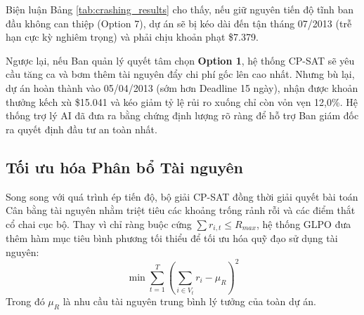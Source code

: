 \begin{table}[H]
\centering
\caption{Tập phương án tối ưu Pareto (Ép tiến độ) cho dự án C2012-04}
\label{tab:crashing_results}
\end{table}

Biện luận Bảng \ref{tab:crashing_results} cho thấy, nếu giữ nguyên tiến độ tĩnh ban đầu không can thiệp (Option 7), dự án sẽ bị kéo dài đến tận tháng 07/2013 (trễ hạn cực kỳ nghiêm trọng) và phải chịu khoản phạt \$7.379. 

Ngược lại, nếu Ban quản lý quyết tâm chọn \textbf{Option 1}, hệ thống CP-SAT sẽ yêu cầu tăng ca và bơm thêm tài nguyên đẩy chi phí gốc lên cao nhất. Nhưng bù lại, dự án hoàn thành vào 05/04/2013 (sớm hơn Deadline 15 ngày), nhận được khoản thưởng kếch xù \$15.041 và kéo giảm tỷ lệ rủi ro xuống chỉ còn vỏn vẹn 12,0\%. Hệ thống trợ lý AI đã đưa ra bằng chứng định lượng rõ ràng để hỗ trợ Ban giám đốc ra quyết định đầu tư an toàn nhất.

\subsection{Tối ưu hóa Phân bổ Tài nguyên}
\label{sec:3.4.3_resource_leveling}

Song song với quá trình ép tiến độ, bộ giải CP-SAT đồng thời giải quyết bài toán Cân bằng tài nguyên nhằm triệt tiêu các khoảng trống rảnh rỗi và các điểm thắt cổ chai cục bộ. Thay vì chỉ ràng buộc cứng $\sum r_{i,t} \le R_{max}$, hệ thống GLPO đưa thêm hàm mục tiêu bình phương tối thiểu để tối ưu hóa quỹ đạo sử dụng tài nguyên:
\begin{equation}
    \min \sum_{t=1}^{T} \left( \sum_{i \in V_t} r_{i} - \mu_R \right)^2
\end{equation}
Trong đó $\mu_R$ là nhu cầu tài nguyên trung bình lý tưởng của toàn dự án.

